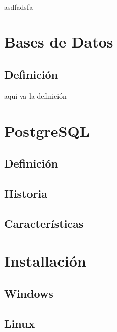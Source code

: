 \documentclass[10pt, a4paper]{article}
\begin{document}
\paragraph{}
asdfadsfa

\section{Bases de Datos}
\subsection{Definición}
aqui va la definición
\section{PostgreSQL}
\subsection{Definición}
\subsection{Historia}
\subsection{Características}

\section{Installación}
\subsection{Windows}
\subsection{Linux}
\end{document}
